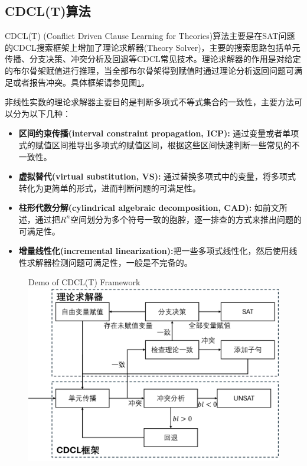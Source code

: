 
\subsection{CDCL(T)算法}
CDCL(T) (Conflict Driven Clause Learning for Theories)算法主要是在SAT问题的CDCL搜索框架上增加了理论求解器(Theory Solver)，主要的搜索思路包括单元传播、分支决策、冲突分析及回退等CDCL常见技术。理论求解器的作用是对给定的布尔骨架赋值进行推理，当全部布尔骨架得到赋值时通过理论分析返回问题可满足或者报告冲突。具体框架请参见图\ref{fig:cdclt}。

非线性实数的理论求解器主要目的是判断多项式不等式集合的一致性，主要方法可以分为以下几种：
\begin{itemize}
    \item \textbf{区间约束传播(interval constraint propagation, ICP):} 通过变量或者单项式的赋值区间推导出多项式的赋值区间，根据这些区间快速判断一些常见的不一致性。
    \item \textbf{虚拟替代(virtual substitution, VS):} 通过替换多项式中的变量，将多项式转化为更简单的形式，进而判断问题的可满足性。
    \item \textbf{柱形代数分解(cylindrical algebraic decomposition, CAD):} 如前文所述，通过把$R^n$空间划分为多个符号一致的胞腔，逐一排查的方式来推出问题的可满足性。
    \item \textbf{增量线性化(incremental linearization):}把一些多项式线性化，然后使用线性求解器检测问题可满足性，一般是不完备的。
\end{itemize}

\begin{figure}[t]
    \centering
     {Demo of CDCL(T) Framework}
    \includegraphics[width=0.6\columnwidth]{Img/cdcl_t.png}
    \label{fig:cdclt}
\end{figure}


